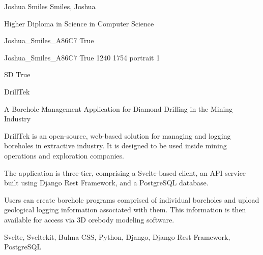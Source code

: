 
\begingroup{}\relax



\def\Key{Joshua_Smiles_A86C7}

{Joshua Smiles}
{Smiles, Joshua}

{Higher Diploma in Science in Computer Science}

{Joshua_Smiles_A86C7}
{True}

{Joshua_Smiles_A86C7}
{True}
{1240}
{1754}
{portrait}
{1}

{SD}
{True}

{DrillTek}

{A Borehole Management Application for Diamond Drilling in the Mining Industry}

{DrillTek is an open-source, web-based solution for managing and logging boreholes in extractive industry. It is designed to be used inside mining operations and exploration companies.

The application is three-tier, comprising a Svelte-based client, an API service built using Django Rest Framework, and a PostgreSQL database.

Users can create borehole programs comprised of individual boreholes and upload geological logging information associated with them. This information is then available for access via 3D orebody modeling software.}

{Svelte, Sveltekit, Bulma CSS, Python, Django, Django Rest Framework, PostgreSQL}

